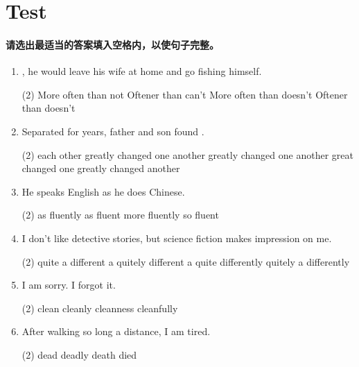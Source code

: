 \section{Test}

\paragraph{请选出最适当的答案填入空格内，以使句子完整。}

\begin{enumerate}
\item \ttu, he would leave his wife at home and go fishing himself.
  \begin{tasks}(2)
    \task More often than not
    \task Oftener than can't
    \task More often than doesn't
    \task Oftener than doesn't
  \end{tasks}

\item Separated for years, father and son found \ttu.
  \begin{tasks}(2)
    \task each other greatly changed
    \task one another greatly changed
    \task one another great changed
    \task one greatly changed another
  \end{tasks}

\item He speaks English \ttu as he does Chinese.
  \begin{tasks}(2)
    \task as fluently
    \task as fluent
    \task more fluently
    \task so fluent
  \end{tasks}

\item I don't like detective stories, but science fiction makes \ttu impression on me.
  \begin{tasks}(2)
    \task quite a different
    \task a quitely different
    \task a quite differently
    \task quitely a differently
  \end{tasks}

\item I am sorry. I \ttu forgot it.
  \begin{tasks}(2)
    \task clean
    \task cleanly
    \task cleanness
    \task cleanfully
  \end{tasks}

\item After walking so long a distance, I am \ttu tired.
  \begin{tasks}(2)
    \task dead
    \task deadly
    \task death
    \task died
  \end{tasks}


\end{enumerate}
